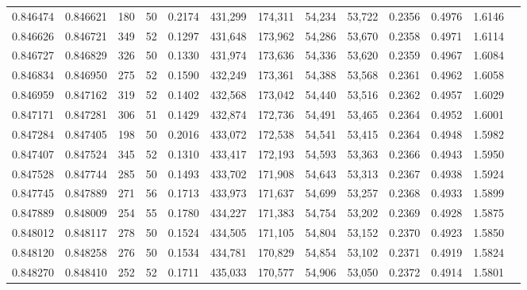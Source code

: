 \begin{tabular}{rrrrrrrrrrrrr}
0.846474 & 0.846621 &   180 &  50 &                                     0.2174 & 431,299 & 174,311 &  54,234 &  53,722 & 0.2356 & 0.4976 & 1.6146 \\
0.846626 & 0.846721 &   349 &  52 &                                     0.1297 & 431,648 & 173,962 &  54,286 &  53,670 & 0.2358 & 0.4971 & 1.6114 \\
0.846727 & 0.846829 &   326 &  50 &                                     0.1330 & 431,974 & 173,636 &  54,336 &  53,620 & 0.2359 & 0.4967 & 1.6084 \\
0.846834 & 0.846950 &   275 &  52 &                                     0.1590 & 432,249 & 173,361 &  54,388 &  53,568 & 0.2361 & 0.4962 & 1.6058 \\
0.846959 & 0.847162 &   319 &  52 &                                     0.1402 & 432,568 & 173,042 &  54,440 &  53,516 & 0.2362 & 0.4957 & 1.6029 \\
0.847171 & 0.847281 &   306 &  51 &                                     0.1429 & 432,874 & 172,736 &  54,491 &  53,465 & 0.2364 & 0.4952 & 1.6001 \\
0.847284 & 0.847405 &   198 &  50 &                                     0.2016 & 433,072 & 172,538 &  54,541 &  53,415 & 0.2364 & 0.4948 & 1.5982 \\
0.847407 & 0.847524 &   345 &  52 &                                     0.1310 & 433,417 & 172,193 &  54,593 &  53,363 & 0.2366 & 0.4943 & 1.5950 \\
0.847528 & 0.847744 &   285 &  50 &                                     0.1493 & 433,702 & 171,908 &  54,643 &  53,313 & 0.2367 & 0.4938 & 1.5924 \\
0.847745 & 0.847889 &   271 &  56 &                                     0.1713 & 433,973 & 171,637 &  54,699 &  53,257 & 0.2368 & 0.4933 & 1.5899 \\
0.847889 & 0.848009 &   254 &  55 &                                     0.1780 & 434,227 & 171,383 &  54,754 &  53,202 & 0.2369 & 0.4928 & 1.5875 \\
0.848012 & 0.848117 &   278 &  50 &                                     0.1524 & 434,505 & 171,105 &  54,804 &  53,152 & 0.2370 & 0.4923 & 1.5850 \\
0.848120 & 0.848258 &   276 &  50 &                                     0.1534 & 434,781 & 170,829 &  54,854 &  53,102 & 0.2371 & 0.4919 & 1.5824 \\
0.848270 & 0.848410 &   252 &  52 &                                     0.1711 & 435,033 & 170,577 &  54,906 &  53,050 & 0.2372 & 0.4914 & 1.5801 \\

\end{tabular}
